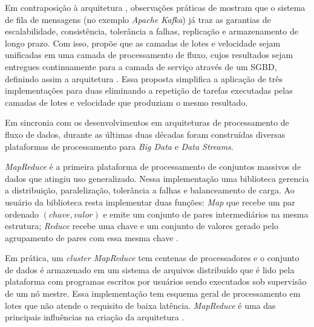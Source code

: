 Em contraposição à arquitetura \lambdaa, observações práticas de 
 mostram que o sistema de fila de mensagens
(no exemplo \emph{Apache Kafka}) já traz as garantias de
escalabilidade, consistência, tolerância a falhas, replicação e armazenamento de longo prazo.
Com isso,  propõe que as camadas de lotes e velocidade sejam
unificadas em uma camada de processamento de fluxo, cujos resultados sejam entregues
continuamente para a camada de serviço através de um SGBD, definindo assim a arquitetura \kappaa.
Essa proposta simplifica a aplicação de três implementações para duas eliminando a
repetição de tarefas executadas pelas camadas de lotes e velocidade que
produziam o mesmo resultado.



Em sincronia com os desenvolvimentos em arquiteturas de processamento de fluxo de dados,
durante as últimas duas décadas foram construídas diversas plataformas de
processamento para \emph{Big Data} e \emph{Data Streams}.

\emph{MapReduce} é a primeira plataforma de processamento de conjuntos massivos
de dados que atingiu uso generalizado.
Nessa implementação uma biblioteca
gerencia a distribuição, paralelização, tolerância a falhas e balanceamento de
carga.
Ao usuário da biblioteca resta implementar duas funções:
\emph{Map} que recebe um par ordenado
$(chave, valor)$ e emite um conjunto de pares intermediários na mesma estrutura;
\emph{Reduce} recebe uma chave e um conjunto de valores gerado pelo agrupamento
de pares com essa mesma chave \cite{Dean2004}.

Em prática, um \emph{cluster MapReduce} tem centenas de processadores e o conjunto de dados é
armazenado em um sistema de arquivos distribuído que é lido pela plataforma com
programas escritos por usuários sendo executados sob supervisão de um nó mestre.
Essa implementação tem esquema geral de processamento em lotes que não atende o
requisito de baixa latência.
\nobreakdash \emph{MapReduce} é uma das principais influências na criação da arquitetura
\lambdaa \cite{marz2015big}.

